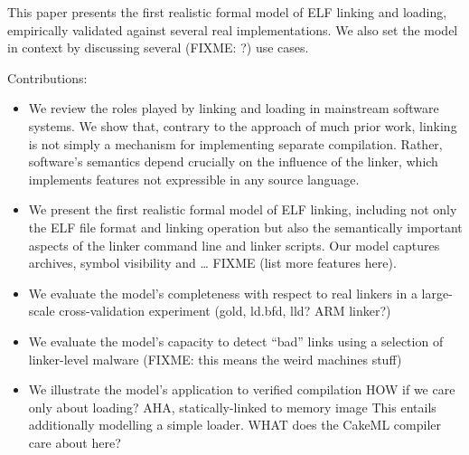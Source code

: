 \documentclass[preprint,natbib,10pt]{sigplanconf}
\begin{document}
This paper presents
the first realistic formal model 
of ELF linking and loading, 
empirically validated against several real implementations.
We also set the model in context
by discussing several (FIXME: ?) use cases.

Contributions:

\begin{itemize}

\item We review the roles played by linking and loading 
in mainstream software systems.
We show that, contrary to the approach of much prior work, linking is not simply a mechanism 
for implementing separate compilation. Rather, software's semantics depend crucially
on the influence of the linker, which implements features not expressible 
in any source language.

\item We present the first realistic formal model of ELF linking, including 
not only the ELF file format and linking operation but also 
the semantically important aspects of the linker command line and linker scripts.
Our model captures archives, symbol visibility and \ldots{} FIXME (list more features here).

\item We evaluate the model's completeness with respect to real linkers 
in a large-scale cross-validation experiment
(gold, ld.bfd, lld? ARM linker?)

\item We evaluate the model's capacity to detect ``bad'' links 
using a selection of linker-level malware (FIXME: this means the weird machines stuff)

\item We illustrate the model's application to verified compilation
HOW if we care only about loading?
AHA, statically-linked to memory image
This entails additionally modelling a simple loader.
WHAT does the CakeML compiler care about here?


% 



\end{itemize}
\end{document}
